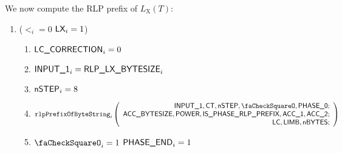 We now compute the RLP prefix of $L_{\mathrm{X}}(T)$:
\begin{enumerate}[resume]
	\item \If ($\lt_{i}=0$ \et $\textsf{LX}_{i}=1$) \Then
	\begin{enumerate}
		\item $\textsf{LC\_CORRECTION}_{i}=0$
		\item $\textsf{INPUT\_1}_{i} = \textsf{RLP\_LX\_BYTESIZE}_{i}$
		\item $\textsf{nSTEP}_{i}=8$
		\item 
				\[
					\rlpPrefixByteString_{i}
					\left(
					\begin{array}{r}
						\Input1,
						\ct,
						\nbstep,
						\done,
						\phase{0}; \\
						\accsize,
						\Power,
						\phaseRlpPrefix,
						\acc1,
						\acc2; \\
						\lc,
						\limb,
						\limbsize; \\
					\end{array}
					\right)
				\]
		\item \If $\done_{i}=1$ \Then $\textsf{PHASE\_END}_{i}=1$
	\end{enumerate}
\end{enumerate}
